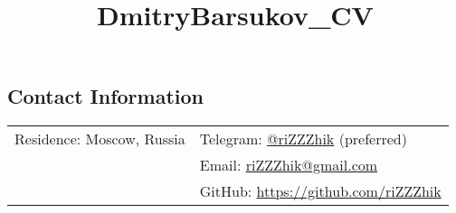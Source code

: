 \documentclass[margin,line]{res}
\begin{document}
\title{DmitryBarsukov_CV}

\begin{resume}

\section{\sc Contact Information}

\vspace{.05in}
\begin{tabular}{@{}p{2.30in}p{3in}}
Residence: Moscow, Russia
& Telegram: \href{https://t.me/riZZZhik}{@riZZZhik} (preferred) \\
& Email: \href{mailto:riZZZhik@gmail.com}{riZZZhik@gmail.com} \\
& GitHub: \href{https://github.com/riZZZhik}{https://github.com/riZZZhik} \\
\end{tabular}





\end{resume}
\end{document}
